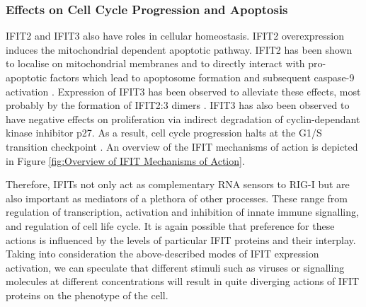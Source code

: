 \subsubsection{Effects on Cell Cycle Progression and Apoptosis} \label{Effects on Cell Cycle Progression and Apoptosis}
IFIT2 and IFIT3 also have roles in cellular homeostasis. IFIT2 overexpression induces the mitochondrial dependent apoptotic pathway. IFIT2 has been shown to localise on mitochondrial membranes and to directly interact with pro-apoptotic factors which lead to apoptosome formation and subsequent caspase-9 activation \cite{Chen2017InhibitionApoptosis, Diamond2013TheProteins}. Expression of IFIT3 has been observed to alleviate these effects, most probably by the formation of IFIT2:3 dimers \cite{Mears2018BetterResponse, Stawowczyk2011TheApoptosis}. IFIT3 has also been observed to have negative effects on proliferation via indirect degradation of cyclin-dependant kinase inhibitor p27. As a result, cell cycle progression halts at the G1/S transition checkpoint \cite{Xiao2006RIG-GProteins}. An overview of the IFIT mechanisms of action is depicted in Figure \ref{fig:Overview of IFIT Mechanisms of Action}.

Therefore, IFITs not only act as complementary RNA sensors to RIG-I but are also important as mediators of a plethora of other processes. These range from regulation of transcription, activation and inhibition of innate immune signalling, and regulation of cell life cycle. It is again possible that preference for these actions is influenced by the levels of particular IFIT proteins and their interplay. Taking into consideration the above-described modes of IFIT expression activation, we can speculate that different stimuli such as viruses or signalling molecules at different concentrations will result in quite diverging actions of IFIT proteins on the phenotype of the cell.

